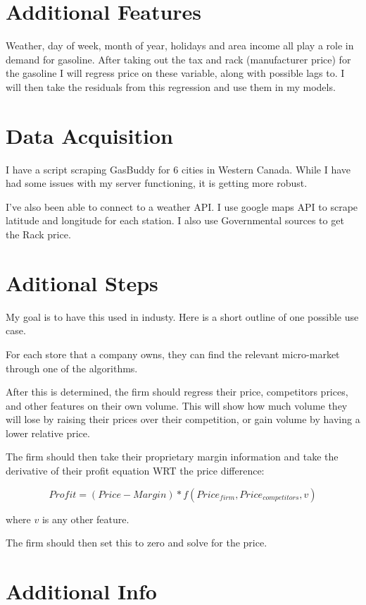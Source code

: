 \documentclass[11pt]{article}
\begin{document}
\section{Additional Features}
\label{sec:org9cce275}

Weather, day of week, month of year, holidays and area income all play a role in
demand for gasoline. After taking out the tax and rack (manufacturer price) for
the gasoline I will regress price on these variable, along with possible lags
to. I will then take the residuals from this regression and use them in my
models.


\section{Data Acquisition}
\label{sec:org068b4e4}

I have a script scraping GasBuddy for 6 cities in Western Canada. While I have
had some issues with my server functioning, it is getting more robust. 

I've also been able to connect to a weather API. I use google maps API to scrape
latitude and longitude for each station. I also use Governmental sources to get
the Rack price.

\section{Aditional Steps}
\label{sec:org91d2ac0}

My goal is to have this used in industy. Here is a short outline of one possible
use case.

For each store that a company owns, they can find the relevant micro-market
through one of the algorithms.

After this is determined, the firm should regress their price, competitors prices,
and other features on their own volume. This will show how much volume they will
lose by raising their prices over their competition, or gain volume by having a
lower relative price.

The firm should then take their proprietary margin information and take the
derivative of their profit equation WRT the price difference:

$$
Profit = (Price - Margin) * f(Price_{firm}, Price_{competitors}, v)
$$

where \(v\) is any other feature. 

The firm should then set this to zero and solve for the price.

\section{Additional Info}
\label{sec:orgfb1fe8e}
\end{document}
